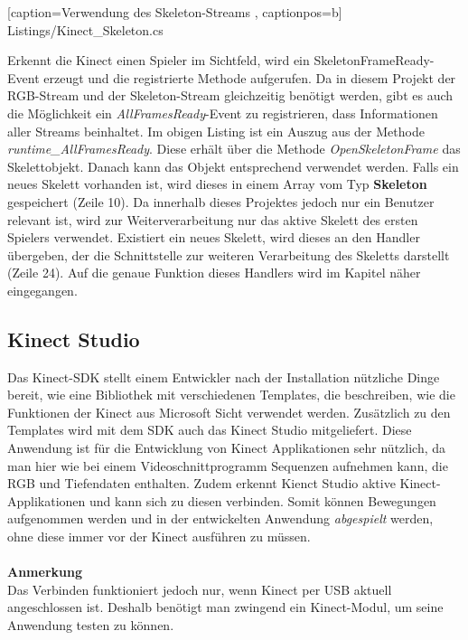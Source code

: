 
    [caption={Verwendung des Skeleton-Streams}
       \label{lst:kinect_skeleton_stream},
       captionpos=b]
{Listings/Kinect_Skeleton.cs}

\noindent
Erkennt die Kinect einen Spieler im Sichtfeld, wird ein SkeletonFrameReady-Event erzeugt und die registrierte Methode aufgerufen. Da in diesem Projekt der RGB-Stream und der Skeleton-Stream gleichzeitig benötigt werden, gibt es auch die Möglichkeit ein \textit{AllFramesReady}-Event zu registrieren, dass Informationen aller Streams beinhaltet. Im obigen Listing ist ein Auszug aus der Methode \textit{runtime\_AllFramesReady}. Diese erhält über die Methode \textit{OpenSkeletonFrame} das Skelettobjekt. Danach kann das Objekt entsprechend verwendet werden. Falls ein neues Skelett vorhanden ist, wird dieses in einem Array vom Typ \textbf{Skeleton} gespeichert (Zeile 10). Da innerhalb dieses Projektes jedoch nur ein Benutzer relevant ist, wird zur Weiterverarbeitung nur das aktive Skelett des ersten Spielers verwendet. Existiert ein neues Skelett, wird dieses an den Handler übergeben, der die Schnittstelle zur weiteren Verarbeitung des Skeletts darstellt (Zeile 24). Auf die genaue Funktion dieses Handlers wird im Kapitel  näher eingegangen.
%
%


\subsection{Kinect Studio}
Das Kinect-SDK stellt einem Entwickler nach der Installation nützliche Dinge bereit, wie eine Bibliothek mit verschiedenen Templates, die beschreiben, wie die Funktionen der Kinect aus Microsoft Sicht verwendet werden. Zusätzlich zu den Templates wird mit dem SDK auch das Kinect Studio mitgeliefert. Diese Anwendung ist für die Entwicklung von Kinect Applikationen sehr nützlich, da man hier wie bei einem Videoschnittprogramm Sequenzen aufnehmen kann, die RGB und Tiefendaten enthalten. Zudem erkennt Kienct Studio aktive Kinect-Applikationen und kann sich zu diesen verbinden. Somit können Bewegungen aufgenommen werden und in der entwickelten Anwendung \textit{abgespielt} werden, ohne diese immer vor der Kinect ausführen zu müssen.
\\ \\
\textbf{Anmerkung}\\
Das Verbinden funktioniert jedoch nur, wenn Kinect per USB aktuell angeschlossen ist. Deshalb benötigt man zwingend ein Kinect-Modul, um seine Anwendung testen zu können.